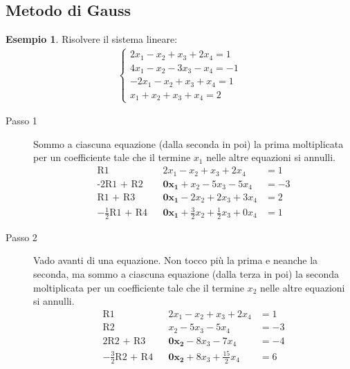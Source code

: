 \documentclass[a4paper]{article}
\theoremstyle{definition}
\newtheorem*{es}{Esempio}
\begin{document}
\subsection{Metodo di Gauss}
	\begin{es}
		Risolvere il sistema lineare:
		\begin{align*}
			\begin{cases}
				2x_1 - x_2 + x_3 + 2x_4 = 1  \\
				4x_1 - x_2 - 3x_3 - x_4 = -1 \\
				 - 2x_1 - x_2 + x_3 + x_4 = 1 \\
				x_1 + x_2 + x_3 + x_4 = 2
			\end{cases}
		\end{align*}
	
		\begin{description}
			\item[Passo 1] Sommo a ciascuna equazione (dalla seconda in poi) la prima moltiplicata per un coefficiente tale che il termine $x_1$ nelle altre equazioni si annulli.
				  \begin{align*}
					  \text{R1}                  &  & 2x_1 - x_2 + x_3 + 2x_4                                & = 1  \\
					  \text{-2R1 + R2}           &  & \mathbf{0x_1} + x_2 - 5x_3 - 5x_4                      & = -3 \\
					  \text{R1 + R3}             &  & \mathbf{0x_1} - 2x_2 + 2x_3 + 3x_4                     & = 2  \\
					  -\frac{1}{2}\text{R1 + R4} &  & \mathbf{0x_1} + \frac{3}{2}x_2 + \frac{1}{2}x_3 + 0x_4 & = 1
				  \end{align*}
			\item[Passo 2] Vado avanti di una equazione. Non tocco più la prima e neanche la seconda, ma sommo a ciascuna equazione (dalla terza in poi) la seconda moltiplicata per un coefficiente tale che il termine $x_2$ nelle altre equazioni si annulli.
				  \begin{align*}
					  \text{R1}                  &  & 2x_1 - x_2 + x_3 + 2x_4                & = 1   \\
					  \text{R2}                  &  & x_2 - 5x_3 - 5x_4                      & = -3  \\
					  \text{2R2 + R3}            &  & \mathbf{0x_2} - 8x_3 - 7x_4            & = - 4 \\
					  -\frac{3}{2}\text{R2 + R4} &  & \mathbf{0x_2} + 8x_3 + \frac{15}{2}x_4 & = 6
				  \end{align*}

\end{description}
\end{es}
\end{document}
